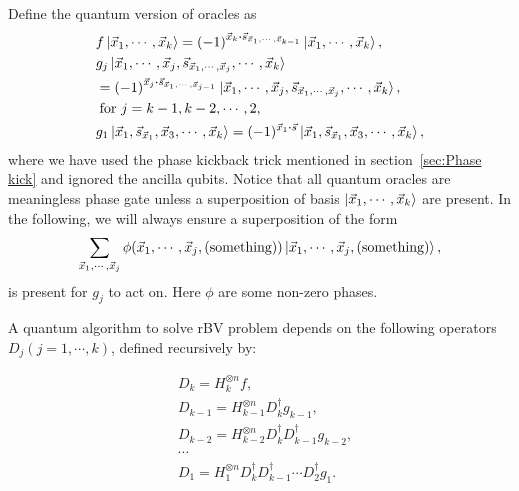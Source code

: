 \documentclass{article}
\begin{document}
Define the quantum version of oracles as
\begin{align}
  & f\ket{\vec{x}_1,\cdots,\vec{x}_k} =
  (-1)^{\vec{x}_k\vdot\vec{s}_{\vec{x}_1,\cdots,\vec{x}_{k-1}}} 
  \ket{\vec{x}_1,\cdots,\vec{x}_k},\\
  & g_j \ket{\vec{x}_1,\cdots, \vec{x}_j, 
    \vec{s}_{\vec{x}_1,\cdots,\vec{x}_j} ,\cdots,\vec{x}_k}\nonumber\\
  & = (-1)^{\vec{x}_j \vdot \vec{s}_{\vec{x}_1,\cdots,\vec{x}_{j-1}}}
    \ket{\vec{x}_1,\cdots, \vec{x}_j, 
    \vec{s}_{\vec{x}_1,\cdots,\vec{x}_j} ,\cdots,\vec{x}_k},\nonumber\\
  & \;\text{for } j=k-1,k-2,\cdots ,2,\\
  & g_1 \ket{\vec{x}_1, \vec{s}_{\vec{x}_1}, \vec{x}_3, \cdots,\vec{x}_k} =
  (-1)^{\vec{x}_1 \vdot \vec{s}} \ket{\vec{x}_1, \vec{s}_{\vec{x}_1}, \vec{x}_3, \cdots,\vec{x}_k},
\end{align}
where we have used the phase kickback trick mentioned in section~\ref{sec:Phase
kick} and ignored the ancilla qubits. Notice that all quantum oracles are
meaningless phase gate unless a superposition of basis
$\ket{\vec{x}_1,\cdots,\vec{x}_k}$ are present. In the following, we will always
ensure a superposition of the form 
\[
  \sum_{\vec{x}_1,\cdots,\vec{x}_j} \phi(\vec{x}_1,\cdots,\vec{x}_j,\text{(something)})
  \ket{\vec{x}_1,\cdots,\vec{x}_j,\text{(something)}},
\]
is present for $g_j$ to act on. Here $\phi$ are some non-zero phases.

A quantum algorithm to solve rBV problem depends on the following operators
$D_j(j=1,\cdots,k)$, defined recursively by:

\begin{align}
  &D_k = H^{\otimes n}_{k} f, \\
  &D_{k-1} = H^{\otimes n}_{k-1} D^\dagger_k g_{k-1}, \\
  &D_{k-2} = H^{\otimes n}_{k-2} D^\dagger_k D^\dagger_{k-1} g_{k-2}, \\
  &\cdots \\
  &D_1 = H^{\otimes n}_1 D^\dagger_k D^\dagger_{k-1}\cdots D^\dagger_2 g_1.
\end{align}
\end{document}
